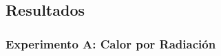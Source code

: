 \documentclass[12pt,a4paper]{config/myConfig}
\begin{document}





\subsection{Resultados}
\label{sec:RESULTADOS}

\subsubsection*{Experimento A: Calor por Radiación}
\end{document}
